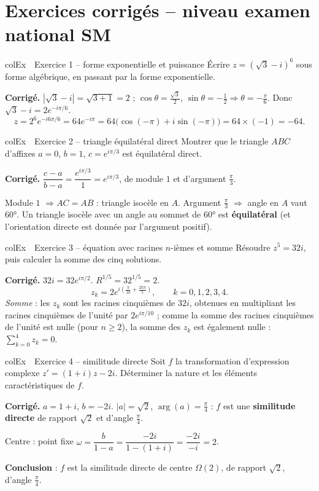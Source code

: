 \documentclass[11pt,a4paper]{article}
\newenvironment{exemple}[1][Exemple]
  {\begin{fiche}{colEx}{\ding{217}~~#1}}{\end{fiche}}
\begin{document}
\section{Exercices corrigés -- niveau examen national SM}

\begin{exemple}[Exercice 1 -- forme exponentielle et puissance]
Écrire $z=\left(\sqrt3-i\right)^6$ sous forme algébrique, en passant par la forme exponentielle.

\smallskip
\textbf{Corrigé.} $|\sqrt3-i|=\sqrt{3+1}=2$ ; $\cos\theta=\frac{\sqrt3}2$, $\sin\theta=-\frac12\Rightarrow\theta=-\frac\pi6$. Donc $\sqrt3-i=2e^{-i\pi/6}$.
\[
  z = 2^6e^{-i6\pi/6} = 64e^{-i\pi} = 64\bigl(\cos(-\pi)+i\sin(-\pi)\bigr) = 64\times(-1) = -64.
\]
\end{exemple}

\begin{exemple}[Exercice 2 -- triangle équilatéral direct]
Montrer que le triangle $ABC$ d'affixes $a=0$, $b=1$, $c=e^{i\pi/3}$ est équilatéral direct.

\smallskip
\textbf{Corrigé.} $\dfrac{c-a}{b-a} = \dfrac{e^{i\pi/3}}{1} = e^{i\pi/3}$, de module $1$ et d'argument $\frac\pi3$.

\smallskip
Module $1$ $\Rightarrow AC=AB$ : triangle isocèle en $A$. Argument $\frac\pi3$ $\Rightarrow$ angle en $A$ vaut $60°$. Un triangle isocèle avec un angle au sommet de $60°$ est \textbf{équilatéral} (et l'orientation directe est donnée par l'argument positif).
\end{exemple}

\begin{exemple}[Exercice 3 -- équation avec racines $n$-ièmes et somme]
Résoudre $z^5=32i$, puis calculer la somme des cinq solutions.

\smallskip
\textbf{Corrigé.} $32i=32e^{i\pi/2}$. $R^{1/5}=32^{1/5}=2$.
\[
  z_k = 2e^{i\left(\frac{\pi}{10}+\frac{2k\pi}5\right)}, \qquad k=0,1,2,3,4.
\]
\emph{Somme} : les $z_k$ sont les racines cinquièmes de $32i$, obtenues en multipliant les racines cinquièmes de l'unité par $2e^{i\pi/10}$ ; comme la somme des racines cinquièmes de l'unité est nulle (pour $n\geq2$), la somme des $z_k$ est également nulle : $\displaystyle\sum_{k=0}^4z_k=0$.
\end{exemple}

\begin{exemple}[Exercice 4 -- similitude directe]
Soit $f$ la transformation d'expression complexe $z'=(1+i)z-2i$. Déterminer la nature et les éléments caractéristiques de $f$.

\smallskip
\textbf{Corrigé.} $a=1+i$, $b=-2i$. $|a|=\sqrt2$, $\arg(a)=\frac\pi4$ : $f$ est une \textbf{similitude directe} de rapport $\sqrt2$ et d'angle $\frac\pi4$.

\smallskip
Centre : point fixe $\omega=\dfrac{b}{1-a}=\dfrac{-2i}{1-(1+i)}=\dfrac{-2i}{-i}=2$.

\smallskip
\textbf{Conclusion} : $f$ est la similitude directe de centre $\Omega(2)$, de rapport $\sqrt2$, d'angle $\frac\pi4$.
\end{exemple}
\end{document}
